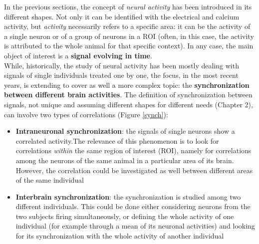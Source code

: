 \documentclass[12pt, a4paper]{report}
\begin{document}
In the previous sections, the concept of \textit{neural activity} has been introduced in its different shapes. Not only it can be identified with the electrical and calcium activity, but \textit{activity} necessarily refers to a specific area: it can be the activity of a single neuron or of a group of neurons in a ROI (often, in this case, the activity is attributed to the whole animal for that specific context). In any case, the main object of interest is a \textbf{signal evolving in time}.\\
While, historically, the study of neural activity has been mostly dealing with signals of single individuals treated one by one, the focus, in the most recent years, is extending to cover as well a more complex topic: the \textbf{synchronization between different brain activities}. The definition of synchronization between signals, not unique and assuming different shapes for different needs (Chapter 2), can involve two types of correlations (Figure \ref{synch}):

\begin{itemize}
	
	\item \textbf{Intraneuronal synchronization}: the signals of  single neurons show a correlated activity.The relevance of this phenomenon is to look for correlations \textit{within} the same region of interest (ROI), namely for correlations among the neurons of the same animal in a particular area of its brain. However, the correlation could be investigated as well between different areas of the same individual
	
	\item \textbf{Interbrain synchronization}: the synchronization is studied among two different individuals. This could be done either considering neurons from the two subjects firing simultaneously, or defining the whole activity of one individual (for example through a mean of its neuronal activities) and looking for its synchronization with the whole activity of another individual
	
\end{itemize}
\end{document}
